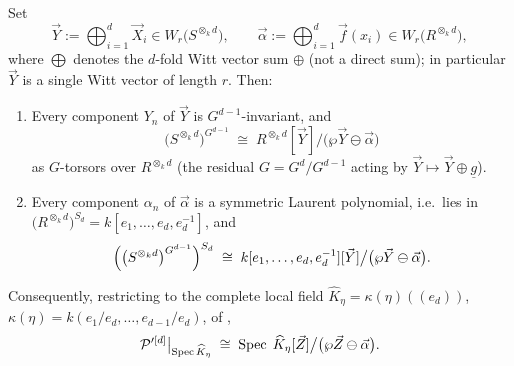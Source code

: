\begin{prop}\label{prop:witt_cover_identification}
    Set
    \[
    \vec Y := \bigoplus_{i=1}^{d} \vec X_i \in W_r\bigl(S^{\otimes_k d}\bigr),
    \qquad
    \vec \alpha := \bigoplus_{i=1}^{d} \vec f(x_i) \in W_r\bigl(R^{\otimes_k d}\bigr),
    \]
    where $\bigoplus$ denotes the $d$-fold Witt vector sum $\oplus$ (not a direct
    sum); in particular $\vec Y$ is a single Witt vector of length $r$. Then:
    \begin{enumerate}
        \item \label{item:witt_cover_invariance} Every component $Y_n$ of $\vec Y$ is
        $G^{d-1}$-invariant, and
        \[
        \bigl(S^{\otimes_k d}\bigr)^{G^{d-1}}
        \;\cong\;
        R^{\otimes_k d}[\vec Y]\big/\bigl(\wp \vec Y \ominus \vec \alpha\bigr)
        \]
        as $G$-torsors over $R^{\otimes_k d}$ (the residual $G = G^d/G^{d-1}$ acting
        by $\vec Y \mapsto \vec Y \oplus \underline g$).
        \item \label{item:witt_cover_symmetry} Every component $\alpha_n$ of
        $\vec \alpha$ is a symmetric Laurent polynomial, i.e.\ lies in
        $\bigl(R^{\otimes_k d}\bigr)^{S_d} = k[e_1, \dots, e_d, e_d^{-1}]$, and
        \[
        \Bigl(\bigl(S^{\otimes_k d}\bigr)^{G^{d-1}}\Bigr)^{S_d}
        \;\cong\;
        k[e_1, \dots, e_d, e_d^{-1}][\vec Y]\big/\bigl(\wp \vec Y \ominus \vec \alpha\bigr).
        \]
    \end{enumerate}
    Consequently, restricting to the complete local field
    $\widehat K_\eta = \kappa(\eta)((e_d))$,
    $\kappa(\eta) = k(e_1/e_d, \dots, e_{d-1}/e_d)$, of
    ,
    \[
    \mathcal{P}'^{[d]}\big|_{\operatorname{Spec} \widehat K_\eta}
    \;\cong\;
    \operatorname{Spec}\; \widehat K_\eta[\vec Z]\big/\bigl(\wp \vec Z \ominus \vec \alpha\bigr).
    \]
\end{prop}

